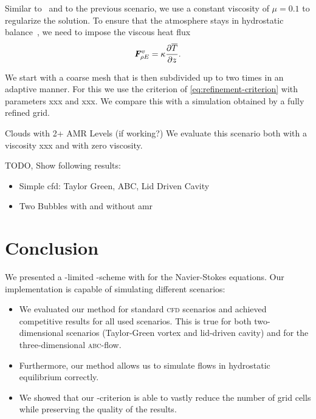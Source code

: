 \documentclass[runningheads]{llncs}
\begin{document}
Similar to~\cite{muller2010adaptive} and to the previous scenario, we use a constant viscosity of $\mu = 0.1$ to regularize the solution.
To ensure that the atmosphere stays in hydrostatic balance~\cite{giraldo2008study}, we need to impose the viscous heat flux
\begin{equation}
  \label{eq:atmosphere-bc}
  \viscFlux_{\QE} = \kappa \pdv{\overline{T}}{z}.%
\end{equation}

We start with a coarse mesh that is then subdivided up to two times in an adaptive manner.
For this we use the criterion of \cref{eq:refinement-criterion} with parameters xxx and xxx.
We compare this with a simulation obtained by a fully refined grid.

Clouds with 2+ AMR Levels (if working?)
We evaluate this scenario both with a viscosity xxx and with zero viscosity.

TODO, Show following results:
\begin{itemize}
\item Simple cfd: Taylor Green, ABC, Lid Driven Cavity
\item Two Bubbles with and without amr
\end{itemize}

\section{Conclusion}
We presented a \muscl{}-limited \aderdg{}-scheme with \amr{} for the Navier-Stokes equations.
Our implementation is capable of simulating different scenarios:
\begin{itemize}
\item We evaluated our method for standard \textsc{cfd} scenarios and achieved competitive results for all used scenarios.
  This is true for both two-dimensional scenarios (Taylor-Green vortex and lid-driven cavity) and for the three-dimensional \textsc{abc}-flow.
\item Furthermore, our method allows us to simulate flows in hydrostatic equilibrium correctly.
\item We showed that our \amr{}-criterion is able to vastly reduce the number of grid cells while preserving the quality of the results.
\end{itemize}

\printbibliography{}
\end{document}
